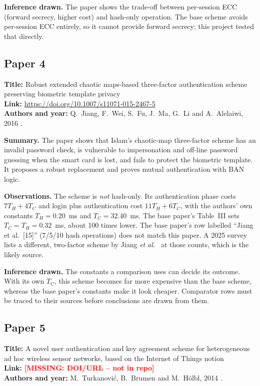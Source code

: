 \documentclass[12pt,a4paper,oneside]{report}
\numberwithin{equation}{chapter}
\newcommand{\MISSING}[1]{\textcolor{red}{\textbf{[MISSING: #1]}}}
\begin{document}
\noindent\textbf{Inference drawn.} The paper shows the trade-off between per-session ECC (forward secrecy, higher cost) and hash-only operation. The base scheme avoids per-session ECC entirely, so it cannot provide forward secrecy; this project tested that directly.

\subsection*{Paper 4}
\noindent\textbf{Title:} Robust extended chaotic maps-based three-factor authentication scheme preserving biometric template privacy\\
\textbf{Link:} \url{https://doi.org/10.1007/s11071-015-2467-5}\\
\textbf{Authors and year:} Q.~Jiang, F.~Wei, S.~Fu, J.~Ma, G.~Li and A.~Alelaiwi, 2016 \cite{jiang2016robust}.

\noindent\textbf{Summary.} The paper shows that Islam's chaotic-map three-factor scheme has an invalid password check, is vulnerable to impersonation and off-line password guessing when the smart card is lost, and fails to protect the biometric template. It proposes a robust replacement and proves mutual authentication with BAN logic.

\noindent\textbf{Observations.} The scheme is \emph{not} hash-only. Its authentication phase costs $7T_H + 4T_C$ and login plus authentication cost $11T_H + 6T_C$, with the authors' own constants $T_H = 0.20$~ms and $T_C = 32.40$~ms. The base paper's Table~III sets $T_C = T_H = 0.32$~ms, about 100 times lower. The base paper's row labelled ``Jiang et al.\ [15]'' (7/5/10 hash operations) does not match this paper. A 2025 survey \cite{zhong2025lightweight} lists a different, two-factor scheme by Jiang \emph{et al.}\ \cite{jiang2015twofactor} at those counts, which is the likely source.

\noindent\textbf{Inference drawn.} The constants a comparison uses can decide its outcome. With its own $T_C$, this scheme becomes far more expensive than the base scheme, whereas the base paper's constants make it look cheaper. Comparator rows must be traced to their sources before conclusions are drawn from them.

\subsection*{Paper 5}
\noindent\textbf{Title:} A novel user authentication and key agreement scheme for heterogeneous ad hoc wireless sensor networks, based on the Internet of Things notion\\
\textbf{Link:} \MISSING{DOI/URL -- not in repo}\\
\textbf{Authors and year:} M.~Turkanovi\'{c}, B.~Brumen and M.~H\"{o}lbl, 2014 \cite{turkanovic2014novel}.
\end{document}
